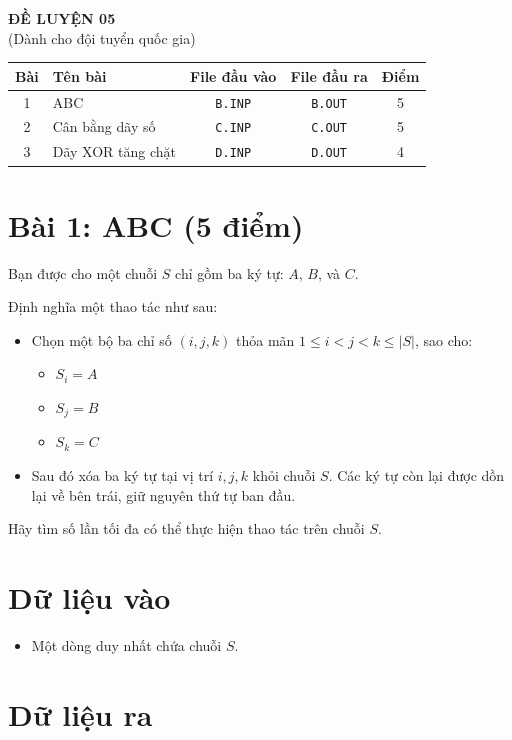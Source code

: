 \begin{center}
    {\LARGE \textbf{ĐỀ LUYỆN 05}}\\[6pt]
    {\large (Dành cho đội tuyển quốc gia)}
\end{center}

\begin{tabularx}{\textwidth}{|c|X|c|c|c|}
\hline
\textbf{Bài} & \textbf{Tên bài} & \textbf{File đầu vào} & \textbf{File đầu ra} & \textbf{Điểm} \\
\hline
1 & ABC & \texttt{B.INP} & \texttt{B.OUT} & 5 \\ \hline
2 & Cân bằng dãy số & \texttt{C.INP} & \texttt{C.OUT} & 5 \\ \hline
3 & Dãy XOR tăng chặt & \texttt{D.INP} & \texttt{D.OUT} & 4 \\ \hline
\end{tabularx}

\newpage
\section*{Bài 1: ABC (5 điểm)}
Bạn được cho một chuỗi $S$ chỉ gồm ba ký tự: $A$, $B$, và $C$.

Định nghĩa một thao tác như sau:
\begin{itemize}
    \item Chọn một bộ ba chỉ số $(i, j, k)$ thỏa mãn $1 \le i < j < k \le |S|$, sao cho:
    \begin{itemize}
        \item $S_i = A$
        \item $S_j = B$
        \item $S_k = C$
    \end{itemize}
    \item Sau đó xóa ba ký tự tại vị trí $i, j, k$ khỏi chuỗi $S$. Các ký tự còn lại được dồn lại về bên trái, giữ nguyên thứ tự ban đầu.
\end{itemize}

Hãy tìm số lần tối đa có thể thực hiện thao tác trên chuỗi $S$.

\section*{Dữ liệu vào}

\begin{itemize}
    \item Một dòng duy nhất chứa chuỗi $S$.
\end{itemize}

\section*{Dữ liệu ra}

